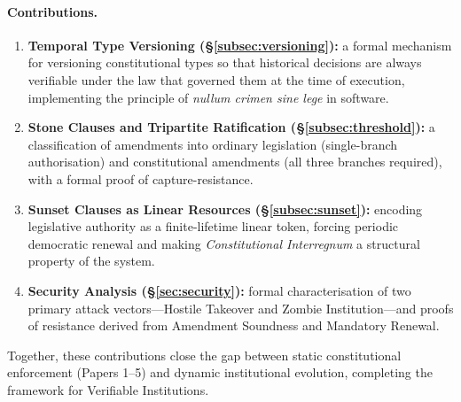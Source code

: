 \paragraph{Contributions.}
\begin{enumerate}
  \item \textbf{Temporal Type Versioning
  (\S\ref{subsec:versioning}):} a formal mechanism for versioning
  constitutional types so that historical decisions are always
  verifiable under the law that governed them at the time of
  execution, implementing the principle of \emph{nullum crimen sine
  lege} in software.
  \item \textbf{Stone Clauses and Tripartite Ratification
  (\S\ref{subsec:threshold}):} a classification of amendments into
  ordinary legislation (single-branch authorisation) and
  constitutional amendments (all three branches required), with a
  formal proof of capture-resistance.
  \item \textbf{Sunset Clauses as Linear Resources
  (\S\ref{subsec:sunset}):} encoding legislative authority as
  a finite-lifetime linear token, forcing periodic democratic
  renewal and making \emph{Constitutional Interregnum} a structural
  property of the system.
  \item \textbf{Security Analysis (\S\ref{sec:security}):}
  formal characterisation of two primary attack vectors---Hostile
  Takeover and Zombie Institution---and proofs of resistance
  derived from Amendment Soundness and Mandatory Renewal.
\end{enumerate}

Together, these contributions close the gap between static
constitutional enforcement (Papers 1--5) and dynamic institutional
evolution, completing the framework for Verifiable Institutions.
